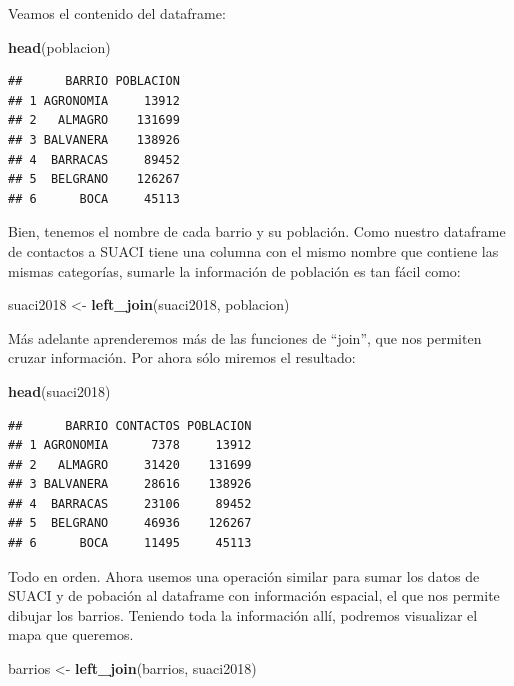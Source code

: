 \documentclass[]{book}
\newenvironment{Shaded}{\begin{snugshade}}{\end{snugshade}}
\newcommand{\KeywordTok}[1]{\textcolor[rgb]{0.13,0.29,0.53}{\textbf{#1}}}
\newcommand{\StringTok}[1]{\textcolor[rgb]{0.31,0.60,0.02}{#1}}
\newcommand{\NormalTok}[1]{#1}
\begin{document}
Veamos el contenido del dataframe:

\begin{Shaded}
\begin{Highlighting}[]
\KeywordTok{head}\NormalTok{(poblacion)}
\end{Highlighting}
\end{Shaded}

\begin{verbatim}
##      BARRIO POBLACION
## 1 AGRONOMIA     13912
## 2   ALMAGRO    131699
## 3 BALVANERA    138926
## 4  BARRACAS     89452
## 5  BELGRANO    126267
## 6      BOCA     45113
\end{verbatim}

Bien, tenemos el nombre de cada barrio y su población. Como nuestro
dataframe de contactos a SUACI tiene una columna con el mismo nombre que
contiene las mismas categorías, sumarle la información de población es
tan fácil como:

\begin{Shaded}
\begin{Highlighting}[]
\NormalTok{suaci2018 <-}\StringTok{ }\KeywordTok{left_join}\NormalTok{(suaci2018, poblacion)}
\end{Highlighting}
\end{Shaded}

Más adelante aprenderemos más de las funciones de ``join'', que nos
permiten cruzar información. Por ahora sólo miremos el resultado:

\begin{Shaded}
\begin{Highlighting}[]
\KeywordTok{head}\NormalTok{(suaci2018)}
\end{Highlighting}
\end{Shaded}

\begin{verbatim}
##      BARRIO CONTACTOS POBLACION
## 1 AGRONOMIA      7378     13912
## 2   ALMAGRO     31420    131699
## 3 BALVANERA     28616    138926
## 4  BARRACAS     23106     89452
## 5  BELGRANO     46936    126267
## 6      BOCA     11495     45113
\end{verbatim}

Todo en orden. Ahora usemos una operación similar para sumar los datos
de SUACI y de pobación al dataframe con información espacial, el que nos
permite dibujar los barrios. Teniendo toda la información allí, podremos
visualizar el mapa que queremos.

\begin{Shaded}
\begin{Highlighting}[]
\NormalTok{barrios <-}\StringTok{ }\KeywordTok{left_join}\NormalTok{(barrios, suaci2018)}
\end{Highlighting}
\end{Shaded}
\end{document}
